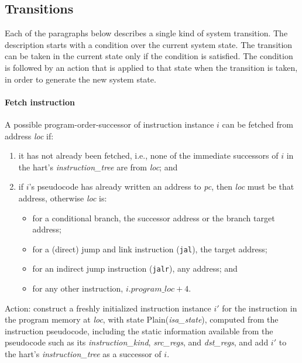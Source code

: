\subsection{Transitions}\label{sec:omm:transitions}

Each of the paragraphs below describes a single kind of system transition.
The description starts with a condition over the current system state.
The transition can be taken in the current state only if the condition is satisfied.
The condition is followed by an action that is applied to that state when the transition is taken, in order to generate the new system state.

\paragraph{Fetch instruction}\label{omm:fetch}
A possible program-order-successor of instruction instance $i$ can be fetched from address {\it loc} if:
\begin{enumerate}
\item it has not already been fetched, i.e., none of the immediate successors of $i$ in the hart's {\it instruction\_tree} are from {\it loc}; and
\item if $i$'s pseudocode has already written an address to {\em pc}, then {\it loc} must be that address, otherwise {\it loc} is:
  \begin{itemize}
  \item for a conditional branch, the successor address or the branch target address;
  \item for a (direct) jump and link instruction ({\tt jal}), the target address;
  \item for an indirect jump instruction ({\tt jalr}), any address; and
  \item for any other instruction, $i.\textit{program\_loc}+4$.
  \end{itemize}
\end{enumerate}

Action: construct a freshly initialized instruction instance $i'$ for the instruction in the program memory at {\it loc}, with state {\sc Plain}({\it isa\_state}), computed from the instruction pseudocode, including the static information available from the pseudocode such as its {\it instruction\_kind}, {\it src\_regs}, and {\it dst\_regs}, and add $i'$ to the hart's {\it instruction\_tree} as a successor of $i$.

